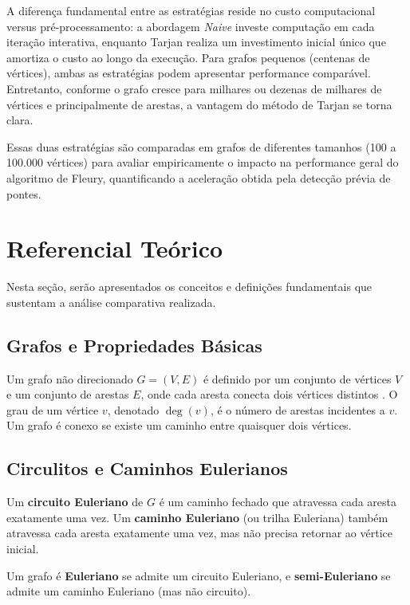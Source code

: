 \documentclass{sbc2023}%
\begin{document}
A diferença fundamental entre as estratégias reside no custo computacional versus pré-processamento: a abordagem \textit{Naive} investe computação em cada iteração interativa, enquanto Tarjan realiza um investimento inicial único que amortiza o custo ao longo da execução. Para grafos pequenos (centenas de vértices), ambas as estratégias podem apresentar performance comparável. Entretanto, conforme o grafo cresce para milhares ou dezenas de milhares de vértices e principalmente de arestas, a vantagem do método de Tarjan se torna clara.

Essas duas estratégias são comparadas em grafos de diferentes tamanhos (100 a 100.000 vértices) para avaliar empiricamente o impacto na performance geral do algoritmo de Fleury, quantificando a aceleração obtida pela detecção prévia de pontes.


\section{Referencial Teórico}

Nesta seção, serão apresentados os conceitos e definições fundamentais que sustentam a análise comparativa realizada.

\subsection{Grafos e Propriedades Básicas}

Um grafo não direcionado $G = (V, E)$ é definido por um conjunto de vértices $V$ e um conjunto de arestas $E$, onde cada aresta conecta dois vértices distintos \cite{diestel:2017}. O grau de um vértice $v$, denotado $\deg(v)$, é o número de arestas incidentes a $v$. Um grafo é conexo se existe um caminho entre quaisquer dois vértices.

\subsection{Circulitos e Caminhos Eulerianos}

Um \textbf{circuito Euleriano} de $G$ é um caminho fechado que atravessa cada aresta exatamente uma vez. Um \textbf{caminho Euleriano} (ou trilha Euleriana) também atravessa cada aresta exatamente uma vez, mas não precisa retornar ao vértice inicial.

Um grafo é \textbf{Euleriano} se admite um circuito Euleriano, e \textbf{semi-Euleriano} se admite um caminho Euleriano (mas não circuito).
\end{document}
